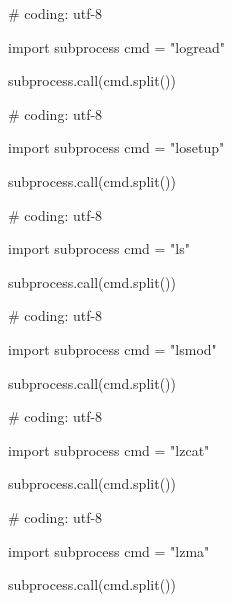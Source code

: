 \begin{mylisting}[label={lst:acpid},language=sh,caption=logread]

# coding: utf-8

import subprocess
cmd = "logread"

subprocess.call(cmd.split())

\end{mylisting}

\begin{mylisting}[label={lst:acpid},language=sh,caption=losetup]

# coding: utf-8

import subprocess
cmd = "losetup"

subprocess.call(cmd.split())

\end{mylisting}

\begin{mylisting}[label={lst:acpid},language=sh,caption=ls]

# coding: utf-8

import subprocess
cmd = "ls"

subprocess.call(cmd.split())

\end{mylisting}

\begin{mylisting}[label={lst:acpid},language=sh,caption=lsmod]

# coding: utf-8

import subprocess
cmd = "lsmod"

subprocess.call(cmd.split())

\end{mylisting}

\begin{mylisting}[label={lst:acpid},language=sh,caption=lzcat]

# coding: utf-8

import subprocess
cmd = "lzcat"

subprocess.call(cmd.split())

\end{mylisting}

\begin{mylisting}[label={lst:acpid},language=sh,caption=lzma]

# coding: utf-8

import subprocess
cmd = "lzma"

subprocess.call(cmd.split())

\end{mylisting}

